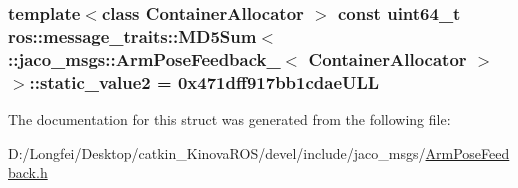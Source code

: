 \subsubsection[{\texorpdfstring{static\+\_\+value2}{static_value2}}]{\setlength{\rightskip}{0pt plus 5cm}template$<$class Container\+Allocator $>$ const uint64\+\_\+t ros\+::message\+\_\+traits\+::\+M\+D5\+Sum$<$ \+::{\bf jaco\+\_\+msgs\+::\+Arm\+Pose\+Feedback\+\_\+}$<$ Container\+Allocator $>$ $>$\+::static\+\_\+value2 = 0x471dff917bb1cdae\+U\+LL\hspace{0.3cm}{\ttfamily [static]}}\hypertarget{structros_1_1message__traits_1_1MD5Sum_3_01_1_1jaco__msgs_1_1ArmPoseFeedback___3_01ContainerAllocator_01_4_01_4_a149ff1391e9d1c20540fba1c267182a0}{}\label{structros_1_1message__traits_1_1MD5Sum_3_01_1_1jaco__msgs_1_1ArmPoseFeedback___3_01ContainerAllocator_01_4_01_4_a149ff1391e9d1c20540fba1c267182a0}


The documentation for this struct was generated from the following file\+:\begin{DoxyCompactItemize}
\item 
D\+:/\+Longfei/\+Desktop/catkin\+\_\+\+Kinova\+R\+O\+S/devel/include/jaco\+\_\+msgs/\hyperlink{ArmPoseFeedback_8h}{Arm\+Pose\+Feedback.\+h}\end{DoxyCompactItemize}
